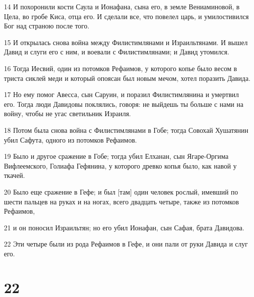 \par 14 И похоронили кости Саула и Ионафана, сына его, в земле Вениаминовой, в Цела, во гробе Киса, отца его. И сделали все, что повелел царь, и умилостивился Бог над страною после того.
\par 15 И открылась снова война между Филистимлянами и Израильтянами. И вышел Давид и слуги его с ним, и воевали с Филистимлянами; и Давид утомился.
\par 16 Тогда Иесвий, один из потомков Рефаимов, у которого копье было весом в триста сиклей меди и который опоясан был новым мечом, хотел поразить Давида.
\par 17 Но ему помог Авесса, сын Саруин, и поразил Филистимлянина и умертвил его. Тогда люди Давидовы поклялись, говоря: не выйдешь ты больше с нами на войну, чтобы не угас светильник Израиля.
\par 18 Потом была снова война с Филистимлянами в Гобе; тогда Совохай Хушатянин убил Сафута, одного из потомков Рефаимов.
\par 19 Было и другое сражение в Гобе; тогда убил Елханан, сын Ягаре-Оргима Вифлеемского, Голиафа Гефянина, у которого древко копья было, как навой у ткачей.
\par 20 Было еще сражение в Гефе; и был [там] один человек рослый, имевший по шести пальцев на руках и на ногах, всего двадцать четыре, также из потомков Рефаимов,
\par 21 и он поносил Израильтян; но его убил Ионафан, сын Сафая, брата Давидова.
\par 22 Эти четыре были из рода Рефаимов в Гефе, и они пали от руки Давида и слуг его.

\chapter{22}

